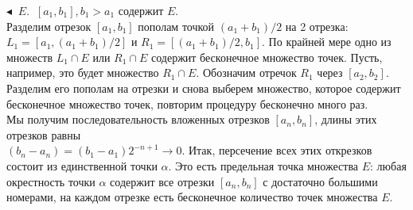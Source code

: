 $\blacktriangleleft$
 $\: E$.  $\: [a_1, b_1], b_1 > a_1$ содержит $E$. \\
Разделим отрезок $[a_1,b_1]$ пополам точкой $(a_1 + b_1)/2$ на 2 отрезка: $L_1 = [a_1, (a_1 + b_1)/2]$ и $R_1 = [(a_1 + b_1)/2, b_1]$.  По крайней мере одно из множеств $L_1 \cap E$ или $R_1 \cap E$ содержит бесконечное множество точек. Пусть, например, это будет множество $R_1 \cap E$. Обозначим отречок $R_1$ через $[a_2, b_2]$. \\ Разделим его пополам на отрезки и снова выберем множество, которое содержит бесконечное множество точек, повторим процедуру бесконечно много раз.\\
Мы получим последовательность вложенных отрезков $[a_n, b_n]$, длины этих отрезков равны \\ $(b_n - a_n) = (b_1 - a_1)2^{-n+1}\rightarrow 0$. Итак, персечение всех этих открезков состоит из единственной точки $\alpha$. Это есть предельная точка множества $E$: любая окрестность точки $\alpha$ содержит все отрезки $[a_n, b_n]$ с достаточно большими номерами, на каждом отрезке есть бесконечное количество точек множества $E$.\\
\\
\\





\section{}

